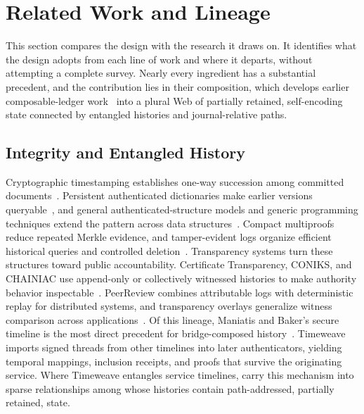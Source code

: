 \section{Related Work and Lineage}
\label{sec:related-work}

This section compares the design with the research it draws on. It identifies what the design adopts from each line of work and where it departs, without attempting a complete survey. Nearly every ingredient has a substantial precedent, and the contribution lies in their composition, which develops earlier composable-ledger work~\cite{dinh2023composable} into a plural Web of partially retained, self-encoding state connected by entangled histories and journal-relative paths.

\subsection{Integrity and Entangled History}

Cryptographic timestamping establishes one-way succession among committed documents~\cite{Haber1991timestamp}. Persistent authenticated dictionaries make earlier versions queryable~\cite{Anagnostopoulos2001persistent}, and general authenticated-structure models and generic programming techniques extend the pattern across data structures~\cite{Martel2004general,Miller2014authenticated}. Compact multiproofs reduce repeated Merkle evidence, and tamper-evident logs organize efficient historical queries and controlled deletion~\cite{Ramabaja2020compact,Crosby2009efficient}. Transparency systems turn these structures toward public accountability. Certificate Transparency, CONIKS, and CHAINIAC use append-only or collectively witnessed histories to make authority behavior inspectable~\cite{Laurie2014certificate,Melara2015coniks,Nikitin2017chainiac}. PeerReview combines attributable logs with deterministic replay for distributed systems, and transparency overlays generalize witness comparison across applications~\cite{Haeberlen2007peerreview,Chase2016transparency}. Of this lineage, Maniatis and Baker's secure timeline  is the most direct precedent for bridge-composed history~\cite{Maniatis2002timeline}. Timeweave imports signed threads from other timelines into later authenticators, yielding temporal mappings, inclusion receipts, and proofs that survive the originating service. Where Timeweave entangles service timelines,   carry this mechanism into sparse relationships among  whose histories contain path-addressed, partially retained,  state.


